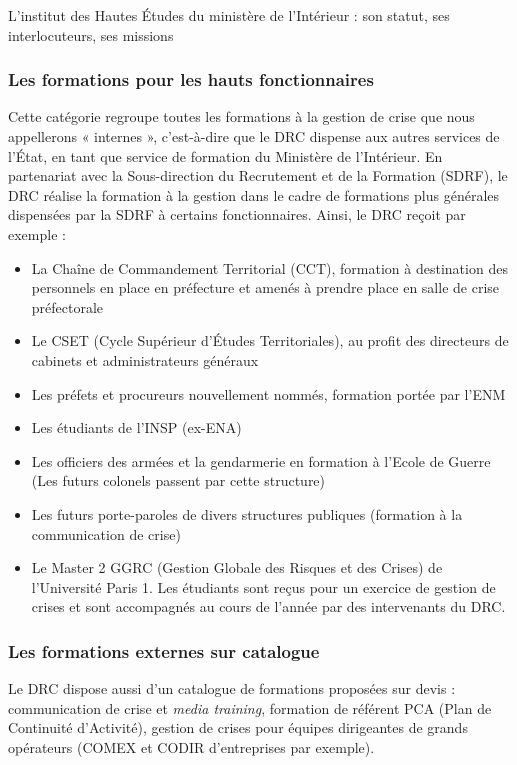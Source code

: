 \documentclass[10pt,a4paper]{report} %
\begin{document}
\begin{part}{L’institut des Hautes Études du ministère de l’Intérieur : son statut, ses interlocuteurs, ses missions}
\subsubsection{Les formations pour les hauts fonctionnaires }
Cette catégorie regroupe toutes les formations à la gestion de crise que nous appellerons « internes », c’est-à-dire que le DRC dispense aux autres services de l’État, en tant que service de formation du Ministère de l’Intérieur.
En partenariat avec la Sous-direction du Recrutement et de la Formation (SDRF), le DRC réalise la formation à la gestion dans le cadre de formations plus générales dispensées par la SDRF à certains fonctionnaires. 
Ainsi, le DRC reçoit par exemple :
\begin{itemize}
    \item La Chaîne de Commandement Territorial (CCT), formation à destination des personnels en place en préfecture et amenés à prendre place en salle de crise préfectorale
    \item Le CSET (Cycle Supérieur d’Études Territoriales), au profit des directeurs de cabinets et administrateurs généraux
    \item Les préfets et procureurs nouvellement nommés, formation portée par l’ENM
    \item Les étudiants de l’INSP (ex-ENA)
    \item Les officiers des armées et la gendarmerie en formation à l’Ecole de Guerre (Les futurs colonels passent par cette structure)
    \item Les futurs porte-paroles de divers structures publiques (formation à la communication de crise)
    \item Le Master 2 GGRC (Gestion Globale des Risques et des Crises) de l’Université Paris 1. Les étudiants sont reçus pour un exercice de gestion de crises et sont accompagnés au cours de l’année par des intervenants du DRC.
\end{itemize}

\subsubsection{Les formations externes sur catalogue}
Le DRC dispose aussi d’un catalogue de formations proposées sur devis : communication de crise et \textit{media training}, formation de référent PCA (Plan de Continuité d’Activité), gestion de crises pour équipes dirigeantes de grands opérateurs (COMEX et CODIR d’entreprises par exemple).


\end{part}
\end{document}
